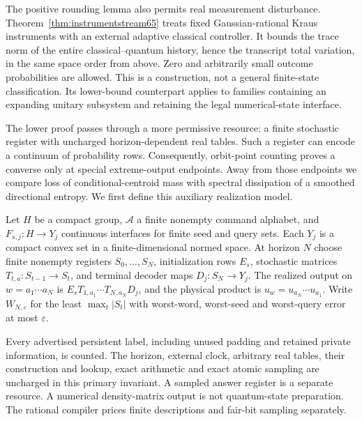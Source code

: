 The positive rounding lemma also permits real measurement disturbance.
Theorem~\ref{thm:instrumentstream65} treats fixed Gaussian-rational
Kraus instruments with an external adaptive classical controller.
It bounds the trace norm of the entire classical--quantum history,
hence the transcript total variation, in the same space order from
above. Zero and arbitrarily small outcome probabilities are allowed.
This is a construction, not a general finite-state classification.
Its lower-bound counterpart applies to families containing an
expanding unitary subsystem and retaining the legal numerical-state
interface.

The lower proof passes through a more permissive resource: a finite
stochastic register with uncharged horizon-dependent real tables.
Such a register can encode a continuum of probability rows.
Consequently, orbit-point counting proves a converse only at special
extreme-output endpoints. Away from those endpoints we compare loss
of conditional-centroid mass with spectral dissipation of a smoothed
directional entropy. We first define this auxiliary realization model.

\begin{definition}\label{def:machine54}
Let $H$ be a compact group, $\mathcal A$ a finite nonempty command
alphabet, and $F_{s,j}:H\to Y_j$ continuous interfaces for finite seed
and query sets. Each $Y_j$ is a compact convex set in a finite-dimensional
normed space. At horizon $N$ choose finite nonempty registers
$S_0,\ldots,S_N$, initialization rows $E_s$, stochastic matrices
$T_{t,a}:S_{t-1}\to S_t$, and terminal decoder maps $D_j:S_N\to Y_j$.
The realized output on $w=a_1\cdots a_N$ is
$E_sT_{1,a_1}\cdots T_{N,a_N}D_j$, and the physical product is
$u_w=u_{a_N}\cdots u_{a_1}$. Write $W_{N,\varepsilon}$ for the least
$\max_t|S_t|$ with worst-word, worst-seed and worst-query error at most
$\varepsilon$.
\end{definition}
Every advertised persistent label, including unused padding and retained
private information, is counted. The horizon, external clock, arbitrary
real tables, their construction and lookup, exact arithmetic and exact
atomic sampling are uncharged in this primary invariant. A sampled
answer register is a separate resource. A numerical density-matrix
output is not quantum-state preparation. The rational compiler prices
finite descriptions and fair-bit sampling separately.

